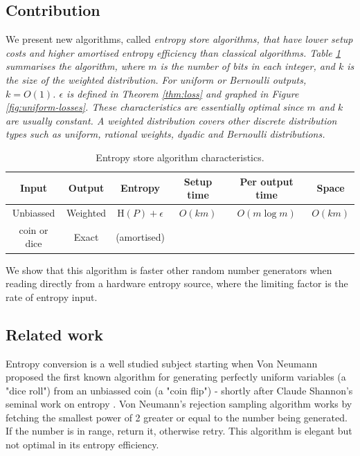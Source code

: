 \documentclass[lettersize,onecolumn]{IEEEtran}
\newcommand{\entropy}[1]{\mathrm{H}(#1)}
\begin{document}
\subsection {Contribution}

We present new algorithms, called \em entropy store algorithms\em, that have lower setup costs and higher amortised entropy efficiency than classical algorithms. Table \ref{tab:entropy-store} summarises the algorithm, where $m$ is the number of bits in each integer, and $k$ is the size of the weighted distribution. For uniform or Bernoulli outputs, $k=O(1)$. $\epsilon$ is defined in Theorem \ref{thm:loss} and graphed in Figure \ref{fig:uniform-losses}. These characteristics are essentially optimal since $m$ and $k$ are usually constant.  A weighted distribution covers other discrete distribution types such as uniform, rational weights, dyadic and Bernoulli distributions.

\begin{table}[h!]
\centering
\begin{tabular}{|c|c|c|c|c|c|}
\hline
Input & Output & Entropy & Setup time & Per output time & Space \\
\hline
Unbiassed & Weighted & $\entropy{P}+\epsilon$ & $O(km)$ & $O(m \log m)$ & $O(km)$ \\
coin or dice & Exact & (amortised) & & &  \\
\hline
\end{tabular}
\caption{Entropy store algorithm characteristics.}
    \label{tab:entropy-store}
\end{table}

We show that this algorithm is faster other random number generators when reading directly from a hardware entropy source, where the limiting factor is the rate of entropy input.

\subsection{Related work}

Entropy conversion is a well studied subject starting when Von Neumann \cite{neumann51} proposed the first known algorithm for generating perfectly uniform variables (a "dice roll") from an unbiassed coin (a "coin flip") - shortly after Claude Shannon's seminal work on entropy \cite{shannon1948mathematical}. Von Neumann's rejection sampling algorithm works by fetching the smallest power of 2 greater or equal to the number being generated. If the number is in range, return it, otherwise retry. This algorithm is elegant but not optimal in its entropy efficiency.
\end{document}
